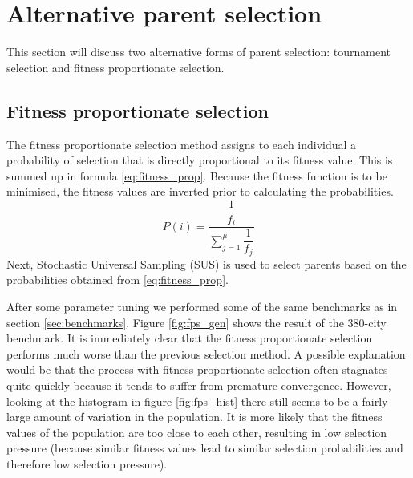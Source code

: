 

\section{Alternative parent selection}
 This section will discuss two alternative forms of parent selection: tournament selection and fitness proportionate selection. 
 
 \subsection{Fitness proportionate selection}
 The fitness proportionate selection method assigns to each individual a probability of selection that is directly proportional to its fitness value. This is summed up in formula \ref{eq:fitness_prop}. Because the fitness function is to be minimised, the fitness values are inverted prior to calculating the probabilities. 
 \begin{equation} \label{eq:fitness_prop}
 P(i) = \dfrac{\dfrac{1}{f_i}}{\sum\limits_{j=1}^\mu {\dfrac{1}{f_j}}}
 \end{equation}
 Next, Stochastic Universal Sampling (SUS) is used to select parents based on the probabilities obtained from \ref{eq:fitness_prop}.
 
 After some parameter tuning we performed some of the same benchmarks as in section \ref{sec:benchmarks}. Figure \ref{fig:fps_gen} shows the result of the 380-city benchmark. It is immediately clear that the fitness proportionate selection performs much worse than the previous selection method. A possible explanation would be that the process with fitness proportionate selection often stagnates quite quickly because it tends to suffer from premature convergence. However, looking at the histogram in figure \ref{fig:fps_hist} there still seems to be a fairly large amount of variation in the population. It is more likely that the fitness values of the population are too close to each other, resulting in low selection pressure (because similar fitness values lead to similar selection probabilities and therefore low selection pressure).
 
